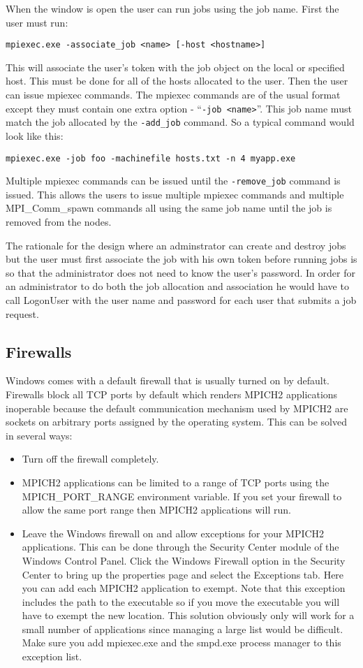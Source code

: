 \documentclass[dvipdfm,11pt]{article}
\begin{document}
When the window is open the user can run jobs using the job name.  First the user must run:
\begin{verbatim}
mpiexec.exe -associate_job <name> [-host <hostname>]
\end{verbatim}
This will associate the user's token with the job object on the local or
specified host.  This must be done for all of the hosts allocated to the user.  Then the user can issue
mpiexec commands.  The mpiexec commands are of the usual format except they must contain one extra option -
``\texttt{-job <name>}''.  This job name must match the job allocated by the \texttt{-add\_job} command.  So a typical command
would look like this:
\begin{verbatim}
mpiexec.exe -job foo -machinefile hosts.txt -n 4 myapp.exe
\end{verbatim}
Multiple mpiexec commands can be issued until the \texttt{-remove\_job} command is issued.
This allows the users to issue multiple 
mpiexec commands and multiple MPI\_Comm\_spawn commands all using the same job name until the job is removed
from the nodes.

The rationale for the design where an adminstrator can create and destroy jobs but the user must first associate
the job with his own token before running jobs is so that the administrator does not need to know the user's
password.  In order for an administrator to do both the job allocation and association he would have to call
LogonUser with the user name and password for each user that submits a job request.

\subsection{Firewalls}
Windows comes with a default firewall that is usually turned on by default.
Firewalls block all TCP ports by default which renders MPICH2 applications inoperable
because the default communication mechanism used by MPICH2 are sockets on arbitrary
ports assigned by the operating system.  This can be solved in several ways:

\begin{itemize}
\item Turn off the firewall completely.
\item  MPICH2 applications can be limited to a range of TCP ports using the 
MPICH\_PORT\_RANGE environment variable.  If you set your firewall to allow the
same port range then MPICH2 applications will run.
\item Leave the Windows firewall on and allow exceptions for your MPICH2 applications.
This can be done through the Security Center module of the Windows Control 
Panel.  Click the Windows Firewall option in the Security Center to bring up
the properties page and select the Exceptions tab.  Here you can add each 
MPICH2 application to exempt.  Note that this exception includes the path to
the executable so if you move the executable you will have to exempt the new
location.  This solution obviously only will work for a small number of 
applications since managing a large list would be difficult.  Make sure you add
mpiexec.exe and the smpd.exe process manager to this exception list.
\end{itemize}
\end{document}
